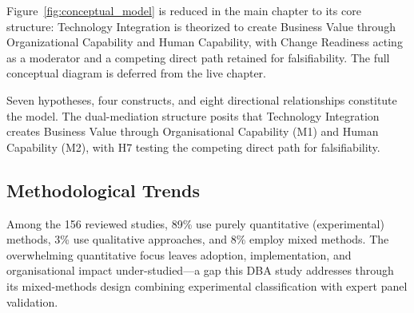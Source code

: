 Figure~\ref{fig:conceptual_model} is reduced in the main chapter to its core structure: Technology Integration is theorized to create Business Value through Organizational Capability and Human Capability, with Change Readiness acting as a moderator and a competing direct path retained for falsifiability. The full conceptual diagram is deferred from the live chapter.

Seven hypotheses, four constructs, and eight directional relationships constitute the model. The dual-mediation structure posits that Technology Integration creates Business Value through Organisational Capability (M1) and Human Capability (M2), with H7 testing the competing direct path for falsifiability.

\subsection{Methodological Trends}

Among the 156 reviewed studies, 89\% use purely quantitative (experimental) methods, 3\% use qualitative approaches, and 8\% employ mixed methods. The overwhelming quantitative focus leaves adoption, implementation, and organisational impact under-studied---a gap this DBA study addresses through its mixed-methods design combining experimental classification with expert panel validation.

